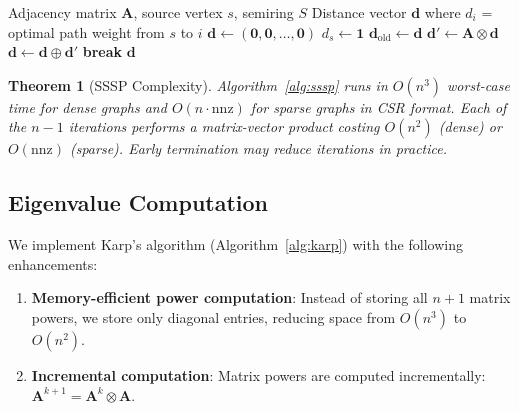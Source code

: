 \documentclass[11pt,a4paper]{article}
\theoremstyle{plain}
\newtheorem{theorem}{Theorem}[section]
\theoremstyle{definition}
\newcommand{\nnz}{\mathrm{nnz}}
\newcommand{\mat}[1]{\mathbf{#1}}
\newcommand{\vect}[1]{\mathbf{#1}}
\begin{document}
\begin{algorithm}[htbp]
\caption{Tropical Single-Source Paths}
\label{alg:sssp}
\begin{algorithmic}[1]
\Require Adjacency matrix $\mat{A}$, source vertex $s$, semiring $S$
\Ensure Distance vector $\vect{d}$ where $d_i$ = optimal path weight from $s$ to $i$
\State $\vect{d} \leftarrow (\mathbf{0}, \mathbf{0}, \ldots, \mathbf{0})$ 
\State $d_s \leftarrow \mathbf{1}$ 
    \State $\vect{d}_{\text{old}} \leftarrow \vect{d}$ 
    \State $\vect{d}' \leftarrow \mat{A} \otimes \vect{d}$ 
    \State $\vect{d} \leftarrow \vect{d} \oplus \vect{d}'$ 
    \If{$\vect{d} = \vect{d}_{\text{old}}$} \textbf{break} 
    \EndIf
\EndFor
\State \Return $\vect{d}$
\end{algorithmic}
\end{algorithm}

\begin{theorem}[SSSP Complexity]
Algorithm~\ref{alg:sssp} runs in $O(n^3)$ worst-case time for dense graphs and $O(n \cdot \nnz)$ for sparse graphs in CSR format. Each of the $n-1$ iterations performs a matrix-vector product costing $O(n^2)$ (dense) or $O(\nnz)$ (sparse). Early termination may reduce iterations in practice.
\end{theorem}

\subsection{Eigenvalue Computation}

We implement Karp's algorithm (Algorithm~\ref{alg:karp}) with the following enhancements:

\begin{enumerate}
    \item \textbf{Memory-efficient power computation}: Instead of storing all $n+1$ matrix powers, we store only diagonal entries, reducing space from $O(n^3)$ to $O(n^2)$.
    
    \item \textbf{Incremental computation}: Matrix powers are computed incrementally: $\mat{A}^{k+1} = \mat{A}^k \otimes \mat{A}$.
\end{enumerate}
\end{document}
